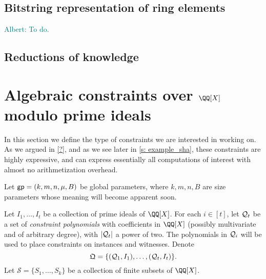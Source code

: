 \documentclass[11pt,letterpaper,usenames,dvipsnames]{article}
\newcommand{\albert}[1]{\textcolor{teal}{Albert: {#1}}}
\begin{document}
\subsection{Bitstring representation of ring elements}\label{s: bistring_reps}
\albert{To do.}

\subsection{Reductions of knowledge}

\section{Algebraic constraints over $\QQ[X]$ modulo prime ideals}

In this section we define the type of constraints we are interested in working on. As we argued in \cref{?}, and as we see later in \cref{s: example_sha}, these constraints are highly expressive, and can  express essentially all computations of interest with almost no arithmetization overhead.

\newcommand{\evalconstraints}{\text{\emph{Eval}}}
\newcommand{\mainQpolyring}{(\QQ[X]_{\leq B})}
\newcommand{\mainQpolyringmultilin}{(\QQ[X]_{\leq B})^{\multilin}}



%

\newcommand{\megaQ}{\mathfrak{Q}}
\renewcommand{\ff}{\mathbf{f}}
\newcommand{\cS}{\mathcal{S}}

Let $\mathsf{gp} = (k, m, n, \mu, B)$ be global parameters, where $k,m,n,B$ are size parameters whose meaning will become apparent soon. 

Let $I_1,\ldots, I_t$ be a collection of prime ideals of $\QQ[X]$. For each $i\in [t]$, let $\mathcal{Q}_t$ be a set  of \emph{constraint polynomials} with coefficients in $\QQ[X]$ (possibly multivariate and of arbitrary degree), with $|\mathcal{Q}_t|$ a power of two.  The polynomials in $\mathcal{Q}_i$ will be used to place constraints on instances and witnesses.
Denote 
%
$$
\megaQ = \{(\cQ_1, I_1), \ldots, (\cQ_t, I_t)\}.
$$
%
Let $\cS=\{S_1, \ldots, S_k\}$ be a collection of finite subsets of $\QQ[X]$.
%
 
\end{document}
